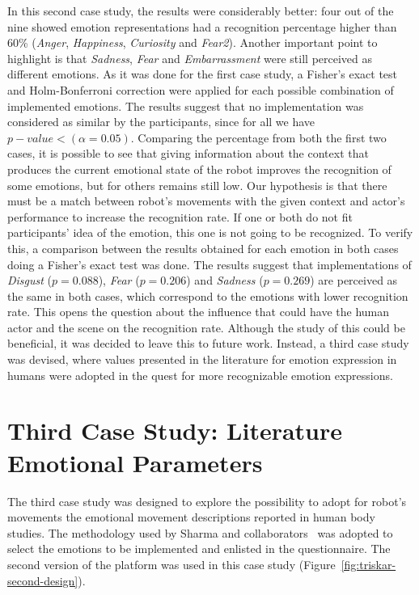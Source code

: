 In this second case study, the results were considerably better: four out of the nine showed emotion representations had a recognition percentage higher than 60\% (\textit{Anger}, \textit{Happiness}, \textit{Curiosity} and \textit{Fear2}). Another important point to highlight is that \textit{Sadness}, \textit{Fear} and \textit{Embarrassment} were still perceived as different emotions. As it was done for the first case study, a Fisher's exact test and Holm-Bonferroni correction were applied for each possible combination of implemented emotions. The results suggest that no implementation was considered as similar by the participants, since for all we have $p-value<(\alpha = 0.05)$. 
Comparing the percentage from both the first two cases, it is possible to see that giving information about the context that produces the current emotional state of the robot improves the recognition of some emotions, but for others remains still low. Our hypothesis is that there must be a match between robot's movements with the given context and actor's performance to increase the recognition rate. If one or both do not fit participants' idea of the emotion, this one is not going to be recognized. To verify this, a comparison between the results obtained for each emotion in both cases doing a Fisher's exact test was done. The results suggest that implementations of \textit{Disgust} ($p=0.088$), \textit{Fear} ($p=0.206$) and \textit{Sadness} ($p=0.269$) are perceived as the same in both cases, which correspond to the emotions with lower recognition rate. This opens the question about the influence that could have the human actor and the scene on the recognition rate. Although the study of this could be beneficial, it was decided to leave this to future work. Instead, a third case study was devised, where values presented in the literature for emotion expression in humans were adopted in the quest for more recognizable emotion expressions.

\section{Third Case Study: Literature Emotional Parameters}

The third case study was designed to explore the possibility to adopt for robot's movements the emotional movement descriptions reported in human body studies. The methodology used by Sharma and collaborators~\cite{Sharma2013} was adopted to select the emotions to be implemented and enlisted in the questionnaire. The second version of the platform was used in this case study (Figure~\ref{fig:triskar-second-design}).

